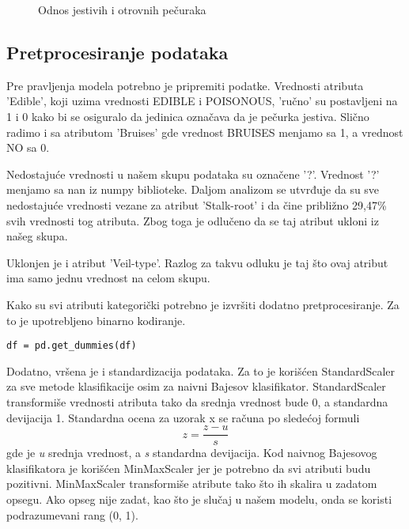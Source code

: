 \documentclass[a4paper]{article}
\begin{document}
\begin{figure}[h]
\centering
\label{fig:jestiveOtrovne}
\caption{Odnos jestivih i otrovnih pečuraka}
\end{figure}

\subsection{Pretprocesiranje podataka}
Pre pravljenja modela potrebno je pripremiti podatke. Vrednosti atributa 'Edible', koji uzima vrednosti EDIBLE i POISONOUS, 'ručno' su postavljeni na 1 i 0 kako bi se osiguralo da jedinica označava da je pečurka jestiva. Slično radimo i sa atributom 'Bruises' gde vrednost BRUISES menjamo sa 1, a vrednost NO sa 0.

Nedostajuće vrednosti u našem skupu podataka su označene '?'. Vrednost '?' menjamo sa nan iz numpy biblioteke. Daljom analizom se utvrđuje da su sve nedostajuće vrednosti vezane za atribut 'Stalk-root' i da čine približno 29,47\% svih vrednosti tog atributa. Zbog toga je odlučeno da se taj atribut ukloni iz našeg skupa. 

Uklonjen je i atribut 'Veil-type'. Razlog za takvu odluku je taj što ovaj atribut ima samo jednu vrednost na celom skupu.

Kako su svi atributi kategorički potrebno je izvršiti dodatno pretprocesiranje. Za to je upotrebljeno binarno kodiranje.\begin{lstlisting}[caption={Binarno kodiranje},frame=single, label=simple]
df = pd.get_dummies(df)
\end{lstlisting}

Dodatno, vršena je i standardizacija podataka. Za to je korišćen StandardScaler za sve metode klasifikacije osim za naivni Bajesov klasifikator. StandardScaler transformiše vrednosti atributa tako da srednja vrednost bude 0, a standardna devijacija 1. Standardna ocena za uzorak x se računa po sledećoj formuli
\begin{equation}
    z = \frac{z - u}{s}
\end{equation}
gde je \textit{u} srednja vrednost, a \textit{s} standardna devijacija\cite{sklearn}. 
Kod naivnog Bajesovog klasifikatora je korišćen MinMaxScaler jer je potrebno da svi atributi budu pozitivni. MinMaxScaler transformiše atribute tako što ih skalira u zadatom opsegu. Ako opseg nije zadat, kao što je slučaj u našem modelu, onda se koristi podrazumevani rang (0, 1)\cite{sklearn}.
\end{document}
